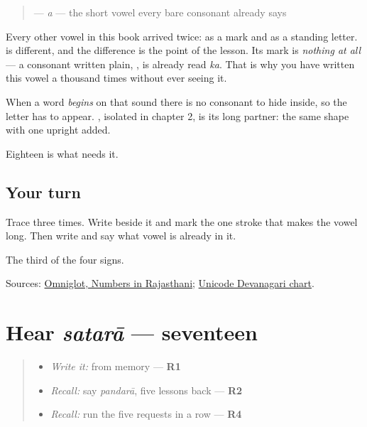 \begin{quote}
\textbf{} — \emph{a} — the short vowel every bare consonant already says
\end{quote}

Every other vowel in this book arrived twice: as a mark and as a standing letter. \textbf{} is different, and the difference is the point of the lesson. Its mark is \emph{nothing at all} — a consonant written plain, \textbf{}, is already read \emph{ka}. That is why you have written this vowel a thousand times without ever seeing it.

When a word \emph{begins} on that sound there is no consonant to hide inside, so the letter has to appear. \textbf{}, isolated in chapter 2, is its long partner: the same shape with one upright added.

Eighteen is what needs it.

\subsection*{Your turn}
Trace \textbf{} three times. Write \textbf{} beside it and mark the one stroke that makes the vowel long. Then write \textbf{} and say what vowel is already in it.

\begin{tcolorbox}[breakable,colback=teal!4,colframe=teal!35!black,title={Before you move on}]
The third of the four signs.

Sources: \href{https://www.omniglot.com/language/numbers/rajasthani.htm}{Omniglot, Numbers in Rajasthani}; \href{https://www.unicode.org/charts/PDF/U0900.pdf}{Unicode Devanagari chart}.
\end{tcolorbox}
\section[satarā]{Hear \emph{satarā} — seventeen}

\label{lesson:MW-C38-hear-satara}



\begin{quote}
\begin{itemize}
\raggedright
  \item \emph{Write it:} \textbf{} from memory — \textbf{R1}
  \item \emph{Recall:} say \emph{pandarā}, five lessons back — \textbf{R2}
  \item \emph{Recall:} run the five requests in a row — \textbf{R4}
\end{itemize}
\end{quote}

